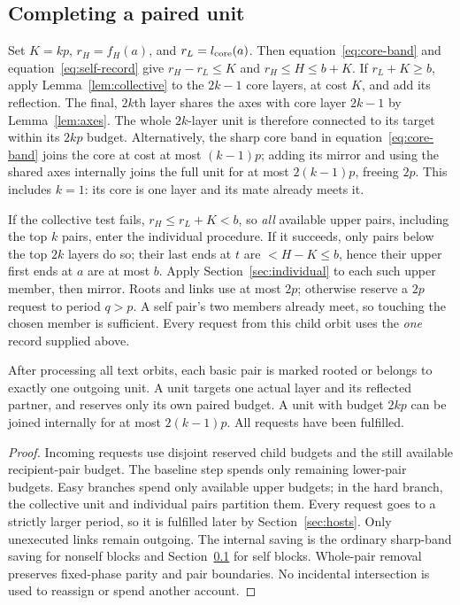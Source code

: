 \subsection{Completing a paired unit}\label{sec:core-completion}
Set $K=kp$, $r_H=f_H(a)$, and $r_L=l_{\rm core}(a)$.
Then equation~\eqref{eq:core-band} and equation~\eqref{eq:self-record} give
$r_H-r_L\le K$ and $r_H\le H\le b+K$.
If $r_L+K\ge b$, apply Lemma~\ref{lem:collective} to the $2k-1$ core
layers, at cost $K$, and add its reflection. The final, $2k$th layer
shares the axes with core layer $2k-1$ by Lemma~\ref{lem:axes}.
The whole $2k$-layer unit is therefore connected to its target within
its $2kp$ budget. Alternatively, the sharp core band
in equation~\eqref{eq:core-band} joins the core at cost at most $(k-1)p$;
adding its mirror and using the shared axes internally joins the full
unit for at most $2(k-1)p$, freeing $2p$.
This includes $k=1$: its core is one layer and its mate already meets it.

If the collective test fails, $r_H\le r_L+K<b$, so \emph{all} available
upper pairs, including the top $k$ pairs, enter the individual procedure.
If it succeeds, only pairs below the top $2k$ layers do so; their last
ends at $t$ are $<H-K\le b$, hence their upper first ends at $a$ are
at most $b$. Apply Section~\ref{sec:individual} to each such upper member,
then mirror. Roots and links use at most $2p$; otherwise reserve a
$2p$ request to period $q>p$. A self pair's two members already meet,
so touching the chosen member is sufficient. Every request from this
child orbit uses the \emph{one} record supplied above.

\begin{proposition}\label{prop:partition}
After processing all text orbits, each basic pair is marked rooted or
belongs to exactly one outgoing unit. A unit targets one actual layer
and its reflected partner, and reserves only its own paired budget.
A unit with budget $2kp$ can be joined internally for at most
$2(k-1)p$. All requests have been fulfilled.
\end{proposition}
\begin{proof}
Incoming requests use disjoint reserved child budgets and the still
available recipient-pair budget. The baseline step spends only remaining
lower-pair budgets. Easy branches spend only available upper budgets;
in the hard branch, the collective unit and individual pairs partition
them. Every request goes to a strictly larger period, so it is fulfilled
later by Section~\ref{sec:hosts}. Only unexecuted links remain outgoing.
The internal saving is the ordinary sharp-band saving for nonself
blocks and Section~\ref{sec:core-completion} for self blocks. Whole-pair removal
preserves fixed-phase parity and pair boundaries. No incidental
intersection is used to reassign or spend another account.
\end{proof}
